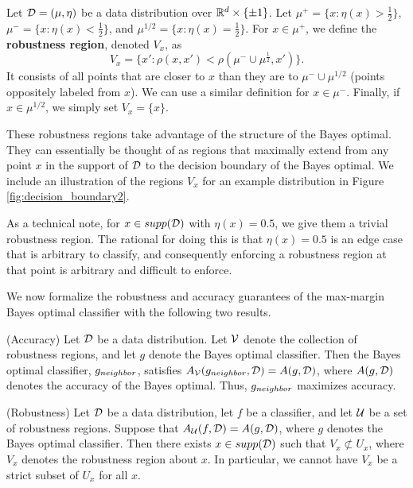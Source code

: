 \begin{defn}\label{def:nat_region}
Let ${\mathcal D} = (\mu, \eta)$ be a data distribution over $\mathbb R^d \times \{\pm 1\}$. Let $\mu^+ = \{x: \eta(x) > \frac{1}{2}\}$, $\mu^- = \{x: \eta(x) < \frac{1}{2}\}$, and $\mu^{1/2} = \{x: \eta(x) = \frac{1}{2}\}$. For $x \in \mu^+$, we define the \textbf{\natural\emph{ }robustness region}, denoted $V_x$, as $$V_x = \{x': \rho(x, x') < \rho(\mu^- \cup \mu^{\frac{1}{2}}, x')\}.$$ It consists of all points that are closer to $x$ than they are to $\mu^- \cup \mu^{1/2}$ (points oppositely labeled from $x$). We can use a similar definition for $x \in \mu^{-}$. Finally, if $x \in \mu^{1/2}$, we simply set $V_x = \{x\}$. 
\end{defn}

These robustness regions take advantage of the structure of the \natural\emph{ }Bayes optimal. They can essentially be thought of as regions that maximally extend from any point $x$ in the support of ${\mathcal D}$ to the decision boundary of the \natural\emph{ }Bayes optimal. We include an illustration of the regions $V_x$ for an example distribution in Figure \ref{fig:decision_boundary2}. 

As a technical note, for $x \in supp({\mathcal D})$ with $\eta(x) = 0.5$, we give them a trivial robustness region. The rational for doing this is that $\eta(x) = 0.5$ is an edge case that is arbitrary to classify, and consequently enforcing a robustness region at that point is arbitrary and difficult to enforce. 

We now formalize the robustness and accuracy guarantees of the max-margin Bayes optimal classifier with the following two results.

\begin{thm}\label{thm:accuracy_margin}
(Accuracy) Let ${\mathcal D}$ be a data distribution. Let ${\mathcal V}$ denote the collection of \natural\emph{ }robustness regions, and let $g$ denote the Bayes optimal classifier. Then the \natural\emph{ }Bayes optimal classifier, $g_{neighbor}$, satisfies $A_{\mathcal V}(g_{neighbor}, {\mathcal D}) = A(g, {\mathcal D})$, where $A(g, {\mathcal D})$ denotes the accuracy of the Bayes optimal. Thus, $g_{neighbor}$ maximizes accuracy.
\end{thm}

\begin{thm}\label{thm:robust_margin}
(Robustness) Let ${\mathcal D}$ be a data distribution, let $f$ be a classifier, and let ${\mathcal U}$ be a set of robustness regions. Suppose that $A_{\mathcal U}(f, {\mathcal D}) = A(g, {\mathcal D})$, where $g$ denotes the Bayes optimal classifier. Then there exists $x \in supp({\mathcal D})$ such that $V_x \not \subset U_x$, where $V_x$ denotes the \natural\emph{ }robustness region about $x$. In particular, we cannot have $V_x$ be a strict subset of $U_x$ for all $x$. 
\end{thm}

